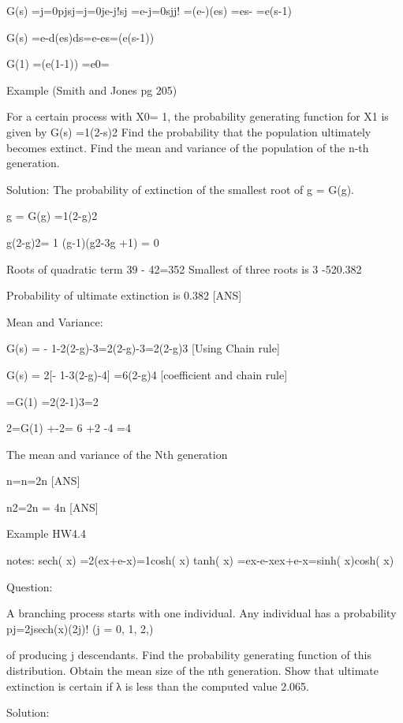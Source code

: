 G(s) =j=0pjsj=j=0je-j!sj   
        =e-j=0sjj! =(e-)(es) 
        =es- =e(s-1)
 
 
G(s) =e-d(es)ds=e-es=(e(s-1)) 
 

G(1) =(e(1-1)) =e0= 
 




Example (Smith and Jones pg 205)
 
For a certain process with X0= 1, the probability generating function for X1 is given by
G(s) =1(2-s)2
Find the probability that the population ultimately becomes extinct. Find the mean and variance of the population of the n-th generation.
 
Solution:
The probability of extinction of the smallest root of g = G(g).
 
g = G(g) =1(2-g)2
 
g(2-g)2= 1              (g-1)(g2-3g +1) = 0   
 
Roots of quadratic term 39 - 42=352
Smallest of three roots is 3 -520.382
 
Probability of ultimate extinction is 0.382 [ANS]
 
Mean and Variance:
 
G(s) = - 1-2(2-g)-3=2(2-g)-3=2(2-g)3          [Using Chain rule]
 
G(s) = 2[- 1-3(2-g)-4] =6(2-g)4                 [coefficient and chain rule]

=G(1) =2(2-1)3=2
 
2=G(1) +-2= 6 +2 -4 =4
 
The mean and variance of the Nth generation
 
 
n=n=2n [ANS]
 
n2=2n = 4n [ANS]
 
 
 
Example HW4.4
 
notes:
 sech( x) =2(ex+e-x)=1cosh( x)            tanh( x) =ex-e-xex+e-x=sinh( x)cosh( x) 
 

 
 
 
Question:
 
A branching process starts with one individual. Any individual has a probability
pj=2jsech(x)(2j)!        (j = 0, 1, 2,)
 
of producing j descendants. Find the probability generating function of this
distribution. Obtain the mean size of the nth generation. Show that ultimate
extinction is certain if λ is less than the computed value 2.065.
 
Solution:
 
